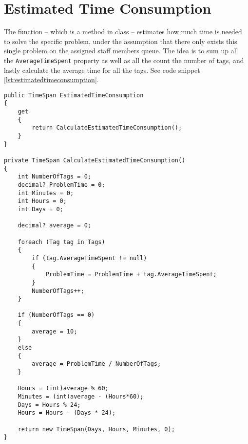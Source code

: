 \section{Estimated Time Consumption}
\label{sec:estimated_time_consumption}

The  function -- which is a method in  class -- estimates how much time is needed to solve the specific problem, under the assumption that there only exists this single problem on the assigned staff members queue. The idea is to sum up all the \verb+AverageTimeSpent+ property as well as all the count the number of tags, and lastly calculate the average time for all the tags. See code snippet \ref{lst:estimatedtimeconsumption}.

\begin{lstlisting}[style=sourceCode, caption=\myCaption{The ManageTagTimes method}, label=lst:estimatedtimeconsumption]
public TimeSpan EstimatedTimeConsumption
{
    get
    {
        return CalculateEstimatedTimeConsumption();
    }
}

private TimeSpan CalculateEstimatedTimeConsumption()
{
    int NumberOfTags = 0;
    decimal? ProblemTime = 0;
    int Minutes = 0;
    int Hours = 0;
    int Days = 0;

    decimal? average = 0;

    foreach (Tag tag in Tags)
    {
        if (tag.AverageTimeSpent != null)
        {
            ProblemTime = ProblemTime + tag.AverageTimeSpent;
        }
        NumberOfTags++;
    }

    if (NumberOfTags == 0)
    {
        average = 10;
    }
    else
    {
        average = ProblemTime / NumberOfTags;
    }

    Hours = (int)average % 60;
    Minutes = (int)average - (Hours*60);
    Days = Hours % 24;
    Hours = Hours - (Days * 24);

    return new TimeSpan(Days, Hours, Minutes, 0);
}
\end{lstlisting}